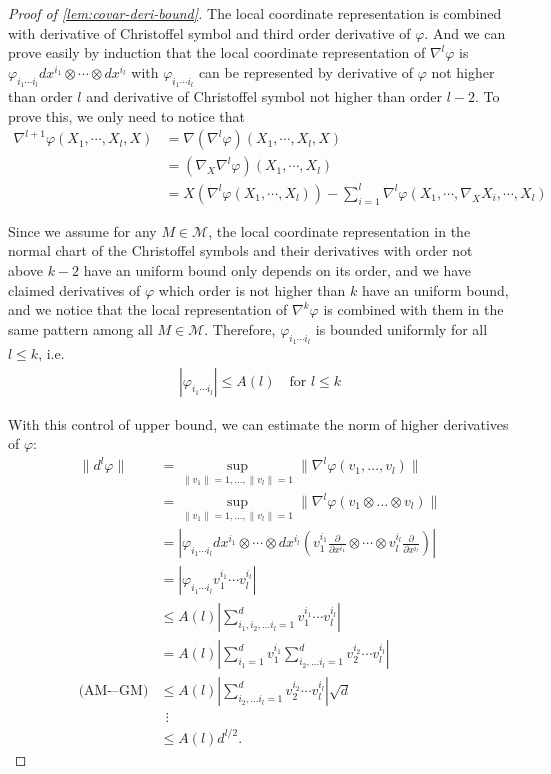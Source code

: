 \begin{proof}[Proof of \cref{lem:covar-deri-bound}]
The local coordinate representation is combined with derivative of Christoffel symbol and third order derivative of $\varphi$. And we can prove easily by induction that the local coordinate representation of $\nabla^l \varphi$ is $\varphi_{i_1\cdots i_l} dx^{i_1} \otimes \cdots \otimes dx^{i_l}$
with $\varphi_{i_1\cdots i_l}$ can be represented by derivative of $\varphi$ not higher than order $l$ and derivative of Christoffel symbol not higher than order $l-2$. To prove this, we only need to notice that 
\begin{align}
	\nabla^{l+1}\varphi(X_1,\cdots,X_l,X)&=\nabla(\nabla^l \varphi)(X_1,\cdots,X_l,X) \\
	&=(\nabla_X \nabla^l \varphi) (X_1,\cdots,X_l)\\
	&=X(\nabla^l \varphi(X_1,\cdots,X_l))-\sum_{i=1}^l \nabla^l\varphi(X_1,\cdots,\nabla_X X_i,\cdots,X_l)
\end{align}

Since we assume for any $M \in \mathcal{M}$, the local coordinate
representation in the normal chart of the Christoffel symbols and
their derivatives with order not above $k-2$ have an uniform bound only depends on its order,
and we have claimed derivatives of $\varphi$ which order is not higher
than $k$ have an uniform bound, and we notice that the local
representation of $\nabla^k \varphi$ is combined with them in the same
pattern among all $M \in \mathcal{M}$. Therefore, $\varphi_{i_1\cdots
  i_l}$ is bounded uniformly for all $l \leq k$, i.e.
\begin{align}
|\varphi_{i_1\cdots i_l}| \leq A(l) \quad \text{for }l\leq k
\end{align}


With this control of upper bound, we can estimate the norm of higher derivatives of $\varphi$:
\begin{align}
	\|d^l \varphi\|&=\sup\limits_{\|v_1\|=1, \dots,\|v_l\|=1} \|\nabla^l \varphi (v_1,\dots,v_l)\| \\
	&=\sup\limits_{\|v_1\|=1, \dots,\|v_l\|=1} \|\nabla^l \varphi (v_1\otimes\dots\otimes v_l)\| \\
	&=|\varphi_{i_1\cdots i_l} dx^{i_1} \otimes \cdots \otimes dx^{i_l} (v_1^{i_1} \frac{\partial}{\partial x^{i_1}} \otimes \cdots \otimes v_l^{i_l} \frac{\partial}{\partial x^{i_l}})|\\
	&=|\varphi_{i_1\cdots i_l} v_1^{i_1} \cdots v_l^{i_l}| \\
	&\leq A(l) \left|\sum_{i_1,i_2,\dots i_l=1}^d   v_1^{i_1} \cdots v_l^{i_l}\right|\\
	&= A(l) \left|\sum_{i_1=1}^{d} v_1^{i_1} \sum_{i_2,\dots i_l=1}^dv_2^{i_2} \cdots v_l^{i_l}\right|\\
	\text{(AM-–GM)}&\leq A(l) \left|\sum_{i_2,\dots i_l=1}^dv_2^{i_2} \cdots v_l^{i_l}\right| \sqrt{d}\\
	&\ \ \vdots \\
	&\leq A(l) d^{l/2}.
\end{align}


\end{proof}
